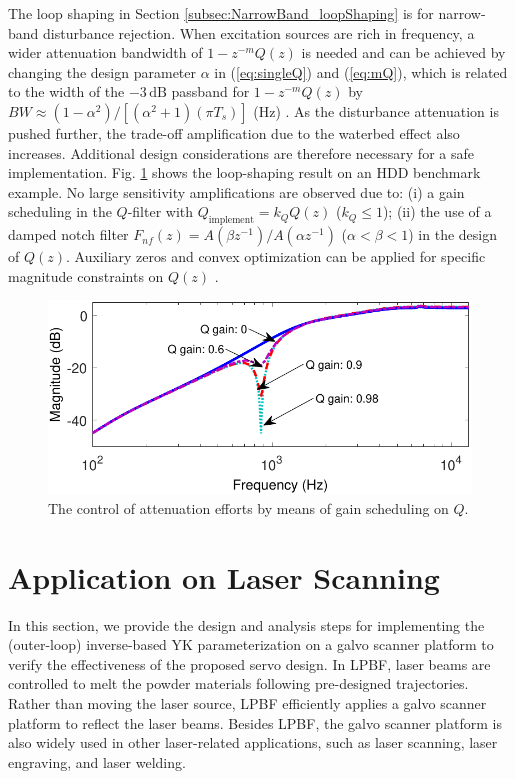 \documentclass [11pt, proquest] {uwthesis}[2020/02/24]
\begin{document}
The loop shaping in Section \ref{subsec:NarrowBand_loopShaping} is
for narrow-band disturbance rejection. When excitation sources are
rich in frequency, a wider attenuation bandwidth of $1-z^{-m}Q(z)$
is needed and can be achieved by changing the design parameter $\alpha$
in (\ref{eq:singleQ}) and (\ref{eq:mQ}), which is related to the
width of the $-3\,\text{dB}$ passband for $1-z^{-m}Q(z)$ by $BW\approx(1-\alpha^{2})/[(\alpha^{2}+1)(\pi T_{s})]$
(Hz) \cite{chen2013inverse}. As the disturbance attenuation is pushed
further, the trade-off amplification due to the waterbed effect also
increases. Additional design considerations are therefore necessary
for a safe implementation. Fig. \ref{fig:The-control-of} shows the
loop-shaping result on an HDD benchmark example. No large sensitivity
amplifications are observed due to: (i) a gain scheduling in the $Q$-filter
with $Q_{\text{implement}}=k_{Q}Q(z)$ ($k_{Q}\leq1$); (ii) the use
of a damped notch filter $F_{nf}(z)=A(\beta z^{-1})/A(\alpha z^{-1})$
($\alpha<\beta<1$) in the design of $Q(z)$. Auxiliary zeros and
convex optimization can be applied for specific magnitude constraints
on $Q(z)$ \cite{chen2014optimal}.
\begin{figure}[!ht]
\begin{centering}
\includegraphics[width=12cm]{Loop-shaping/bandlimited_bode_S_Qgian_scheduling}
\par\end{centering}
\caption{\label{fig:The-control-of}The control of attenuation efforts by means
of gain scheduling on $Q$.}
\end{figure}

\section{Application on Laser Scanning} \label{sec:A-Case-Study-on-a-Galvo-Scanner-System}

\label{sec:A-case-study} In this section, we provide the design and
analysis steps for implementing the (outer-loop) inverse-based YK
parameterization on a galvo scanner platform to verify the effectiveness
of the proposed servo design. In LPBF, laser beams are controlled to melt the powder materials
following pre-designed trajectories. Rather than moving the laser
source, LPBF efficiently applies a galvo scanner platform to reflect
the laser beams. Besides LPBF, the galvo scanner platform is also widely
used in other laser-related applications, such as laser scanning, laser
engraving, and laser welding.
\end{document}
